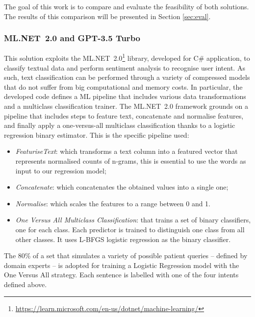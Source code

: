 The goal of this work is to compare and evaluate the feasibility of both solutions. The results of this comparison will be presented in Section \ref{sec:eval}.

\subsubsection{ML.NET~2.0 and GPT-3.5 Turbo}
This solution exploits the ML.NET~2.0\footnote{\url{https://learn.microsoft.com/en-us/dotnet/machine-learning/}} library, developed for C\# application, to classify textual data and perform sentiment analysis to recognise user intent. 
%
%
As such, text classification can be performed through a variety of compressed models that do not suffer from big computational and memory costs.
In particular, the developed code defines a ML pipeline that includes various data transformations and a multiclass classification trainer. 
%
The ML.NET~2.0 framework grounds on a pipeline that includes steps to feature text, concatenate and normalise features, and finally apply a one-versus-all multiclass classification thanks to a logistic regression binary estimator. This is the specific pipeline used:
\begin{itemize}
    \item \emph{FeaturiseText}: which transforms a text column into a featured vector that represents normalised counts of n-grams, this is essential to use the words as input to our regression model;
    \item \emph{Concatenate}: which concatenates the obtained values into a single one;
    \item \emph{Normalise}: which scales the features to a range between 0 and 1.
    \item \emph{One Versus All Multiclass Classification}: that trains a set of binary classifiers, one for each class. Each predictor is trained to distinguish one class from all other classes. It uses L-BFGS logistic regression as the binary classifier.
\end{itemize}
%
The 80\% of a set that simulates a variety of possible patient queries -- defined by domain experts -- is adopted for training a Logistic Regression model with the One Versus All strategy.
%
Each sentence is labelled with one of the four intents defined above.

